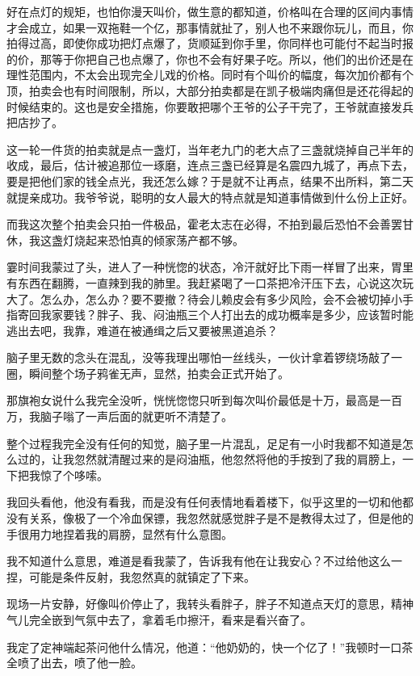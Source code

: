 好在点灯的规矩，也怕你漫天叫价，做生意的都知道，价格叫在合理的区间内事情才会成立，如果一双拖鞋一个亿，那事情就扯了，别人也不来跟你玩儿，而且，你拍得过高，即使你成功把灯点爆了，货顺延到你手里，你同样也可能付不起当时报的价，那等于你把自己也点爆了，你也不会有好果子吃。所以，他们的出价还是在理性范围内，不太会出现完全儿戏的价格。同时有个叫价的幅度，每次加价都有个顶，拍卖会也有时间限制，所以，大部分拍卖都是在凯子极端肉痛但是还花得起的时候结束的。这也是安全措施，你要敢把哪个王爷的公子干完了，王爷就直接发兵把店抄了。

这一轮一件货的拍卖就是点一盏灯，当年老九门的老大点了三盏就烧掉自己半年的收成，最后，估计被追那位一琢磨，连点三盏已经算是名震四九城了，再点下去，要是把他们家的钱全点光，我还怎么嫁？于是就不让再点，结果不出所料，第二天就提亲成功。我爷爷说，聪明的女人最大的特点就是知道事情做到什么份上正好。

而我这次整个拍卖会只拍一件极品，霍老太志在必得，不拍到最后恐怕不会善罢甘休，我这盏灯烧起来恐怕真的倾家荡产都不够。

霎时间我蒙过了头，进人了一种恍惚的状态，冷汗就好比下雨一样冒了出来，胃里有东西在翻腾，一直辣到我的肺里。我赶紧喝了一口茶把冷汗压下去，心说这次玩大了。怎么办，怎么办？要不要撤？待会儿赖皮会有多少风险，会不会被切掉小手指寄回我家要钱？胖子、我、闷油瓶三个人打出去的成功概率是多少，应该暂时能逃出去吧，我靠，难道在被通缉之后又要被黑道追杀？

脑子里无数的念头在混乱，没等我理出哪怕一丝线头，一伙计拿着锣绕场敲了一圈，瞬间整个场子鸦雀无声，显然，拍卖会正式开始了。

那旗袍女说什么我完全没听，恍恍惚惚只听到每次叫价最低是十万，最高是一百万，我脑子嗡了一声后面的就更听不清楚了。

整个过程我完全没有任何的知觉，脑子里一片混乱，足足有一小时我都不知道是怎么过的，让我忽然就清醒过来的是闷油瓶，他忽然将他的手按到了我的肩膀上，一下把我惊了个哆嗦。

我回头看他，他没有看我，而是没有任何表情地看着楼下，似乎这里的一切和他都没有关系，像极了一个冷血保镖，我忽然就感觉胖子是不是教得太过了，但是他的手很用力地捏着我的肩膀，显然有什么意图。

我不知道什么意思，难道是看我蒙了，告诉我有他在让我安心？不过给他这么一捏，可能是条件反射，我忽然真的就镇定了下来。

现场一片安静，好像叫价停止了，我转头看胖子，胖子不知道点天灯的意思，精神气儿完全嵌到气氛中去了，拿着毛巾擦汗，看来是看兴奋了。

我定了定神端起茶问他什么情况，他道：“他奶奶的，快一个亿了！”我顿时一口茶全喷了出去，喷了他一脸。

